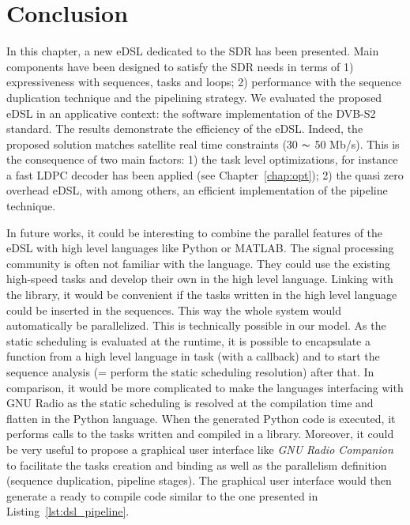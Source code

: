 \section{Conclusion}

In this chapter, a new eDSL dedicated to the SDR has been presented. Main
components have been designed to satisfy the SDR needs in terms of 1)
expressiveness with sequences, tasks and loops; 2) performance with the sequence
duplication technique and the pipelining strategy. We evaluated the proposed
eDSL in an applicative context: the software implementation of the DVB-S2
standard. The results demonstrate the efficiency of the \AFFECT eDSL. Indeed,
the proposed solution matches satellite real time constraints (30 $\thicksim$
50 Mb/s). This is the consequence of two main factors: 1) the task level
optimizations, for instance a fast LDPC decoder has been applied (see
Chapter~\ref{chap:opt}); 2) the quasi zero overhead eDSL, with among others, an
efficient implementation of the pipeline technique.

In future works, it could be interesting to combine the parallel features of the
\AFFECT eDSL with high level languages like Python or MATLAB\R. The signal
processing community is often not familiar with the \Cxx language. They could
use the existing high-speed \Cxx tasks and develop their own in the high level
language. Linking with the \AFFECT library, it would be convenient if the tasks written
in the high level language could be inserted in the \AFFECT sequences. This way
the whole system would automatically be parallelized. This is technically
possible in our model. As the static scheduling is evaluated at the runtime, it
is possible to encapsulate a function from a high level language in \AFFECT task
(with a callback) and to start the sequence analysis (= perform the static
scheduling resolution) after that. In comparison, it would be more complicated
to make the languages interfacing with GNU Radio as the static scheduling is
resolved at the compilation time and flatten in the Python language. When the
generated Python code is executed, it performs calls to the tasks written and
compiled in a \Cxx library. Moreover, it could be very useful to propose a
graphical user interface like \emph{GNU Radio Companion} to facilitate the tasks
creation and binding as well as the parallelism definition (sequence
duplication, pipeline stages). The graphical user interface would then generate
a ready to compile \Cxx code similar to the one presented in
Listing~\ref{lst:dsl_pipeline}.